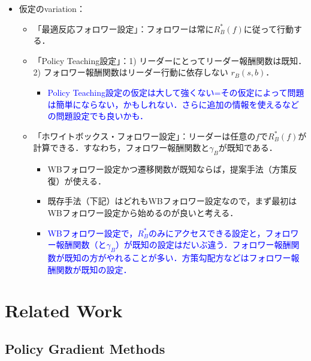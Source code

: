 \documentclass[a4paper,10pt,dvipdfmx]{jsarticle}
\begin{document}
\begin{itemize}
\begin{itemize}
    \end{itemize}
    \item 仮定のvariation：
    \begin{itemize}
        \item 「最適反応フォロワー設定」：フォロワーは常に$R_B^*(f)$に従って行動する．
        \item 「Policy Teaching設定」：1) リーダーにとってリーダー報酬関数は既知．2) フォロワー報酬関数はリーダー行動に依存しない $r_B(s,b)$．
        \begin{itemize}
            \item \textcolor{blue}{Policy Teaching設定の仮定は大して強くない=その仮定によって問題は簡単にならない，かもしれない．さらに追加の情報を使えるなどの問題設定でも良いかも．}
        \end{itemize}
        \item 「ホワイトボックス・フォロワー設定」：リーダーは任意の$f$で$R_B^*(f)$が計算できる．すなわち，フォロワー報酬関数と$\gamma_B$が既知である．
        \begin{itemize}
            \item WBフォロワー設定かつ遷移関数が既知ならば，提案手法（方策反復）が使える．
            \item 既存手法（下記）はどれもWBフォロワー設定なので，まず最初はWBフォロワー設定から始めるのが良いと考える．
            \item \textcolor{blue}{WBフォロワー設定で，$R_B^*$のみにアクセスできる設定と，フォロワー報酬関数（と$\gamma_B$）が既知の設定はだいぶ違う．フォロワー報酬関数が既知の方がやれることが多い．方策勾配方などはフォロワー報酬関数が既知の設定．}
        \end{itemize}
    \end{itemize}
\end{itemize}


\section{Related Work}


\subsection{Policy Gradient Methods}
\end{document}
